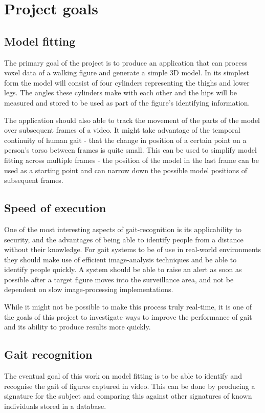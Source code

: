 \section{Project goals}

\subsection{Model fitting}

The primary goal of the project is to produce an application that can process voxel data of a walking figure and generate a simple 3D model.
In its simplest form the model will consist of four cylinders representing the thighs and lower legs.
The angles these cylinders make with each other and the hips will be measured and stored to be used as part of the figure's identifying information.

The application should also able to track the movement of the parts of the model over subsequent frames of a video.
It might take advantage of the temporal continuity of human gait - that the change in position of a certain point on a person's torso between frames is quite small.
This can be used to simplify model fitting across multiple frames -
the position of the model in the last frame can be used as a starting point and can narrow down the possible model positions of subsequent frames.


\subsection{Speed of execution}

One of the most interesting aspects of gait-recognition is its applicability to security, and the advantages of being able to identify people from a distance without their knowledge.
For gait systems to be of use in real-world environments they should make use of efficient image-analysis techniques and be able to identify people quickly.
A system should be able to raise an alert as soon as possible after a target figure moves into the surveillance area, and not be dependent on slow image-processing implementations.

While it might not be possible to make this process truly real-time, it is one of the goals of this project to investigate ways to improve the performance of gait and its ability to produce results more quickly.


\subsection{Gait recognition}

The eventual goal of this work on model fitting is to be able to identify and recognise the gait of figures captured in video.
This can be done by producing a signature for the subject and comparing this against other signatures of known individuals stored in a database.

